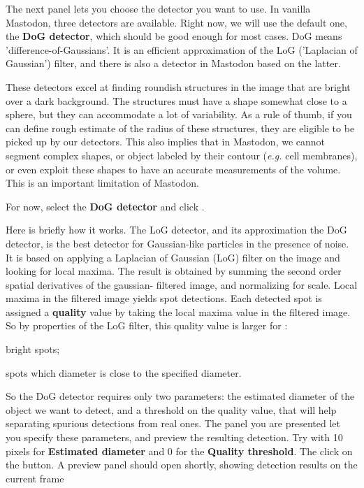 The next panel lets you choose the detector you want to use.
In vanilla Mastodon, three detectors are available.
Right now, we will use the default one, the \textbf{DoG detector}, which should be good enough for most cases.
DoG means 'difference-of-Gaussians'.
It is an efficient approximation of the LoG ('Laplacian of Gaussian') filter, and there is also a detector in Mastodon based on the latter.

These detectors excel at finding roundish structures in the image that are bright over a dark background.
The structures must have a shape somewhat close to a sphere, but they can accommodate a lot of variability.
As a rule of thumb, if you can define rough estimate of the radius of these structures, they are eligible to be picked up by our detectors. 
This also implies that in Mastodon, we cannot segment complex shapes, or object labeled by their contour (\textit{e.g.} cell membranes), or even exploit these shapes to have an accurate measurements of the volume. 
This is an important limitation of Mastodon.

For now, select the \textbf{DoG detector} and click .

Here is briefly  how it works.
The LoG detector, and its approximation the DoG detector, is the best detector for Gaussian-like particles in the presence of noise. 
It is based on applying a Laplacian of Gaussian (LoG) filter on the image and looking for local maxima. The result is obtained by summing the second order spatial derivatives of the gaussian- filtered image, and normalizing for scale.
Local maxima in the filtered image yields spot detections. 
Each detected spot is assigned a \textbf{quality} value by taking the local maxima value in the filtered image.
So by properties of the LoG filter, this quality value is larger for :
\begin{myitemize}
    \item bright spots;
    \item spots which diameter is close to the specified diameter.
\end{myitemize}

So the DoG detector requires only two parameters: the estimated diameter of the object we want to detect, and a threshold on the quality value, that will help separating spurious detections from real ones. 
The panel you are presented let you specify these parameters, and preview the resulting detection.
Try with 10 pixels for \textbf{Estimated diameter} and 0 for the \textbf{Quality threshold}.
The click on the  button.
A preview panel should open shortly, showing detection results on the current frame

